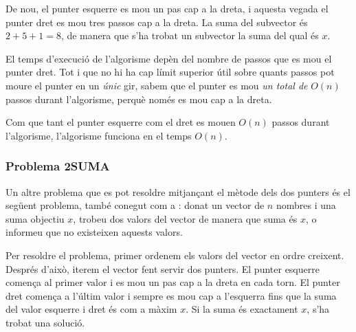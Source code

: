 De nou, el punter esquerre es mou un pas cap a la dreta, i aquesta
vegada el punter dret es mou tres passos cap a la dreta. La suma del
subvector és $2+5+1=8$, de manera que s'ha trobat un subvector la suma
del qual és $x$.


\begin{center}
\end{center}


El temps d'execució de l'algorisme depèn del nombre de passos que es
mou el punter dret. Tot i que no hi ha cap límit superior útil sobre
quants passos pot moure el punter en un \emph{únic} gir, sabem que el
punter es mou \emph{un total de} $O(n)$ passos durant l'algorisme, perquè
només es mou cap a la dreta.

Com que tant el punter esquerre com el dret es mouen $O(n)$ passos durant
l'algorisme, l'algorisme funciona en el temps $O(n)$.

\subsubsection{Problema 2SUMA}


Un altre problema que es pot resoldre mitjançant el mètode dels dos
punters és el següent problema, també conegut com a :
donat un vector de $n$ nombres i una suma objectiu $x$,
trobeu dos valors del vector de manera que suma és $x$, o informeu que
no existeixen aquests valors.

Per resoldre el problema, primer ordenem els valors del vector en
ordre creixent. Després d'això, iterem el vector fent servir dos
punters. El punter esquerre comença al primer valor i es mou un pas
cap a la dreta en cada torn. El punter dret comença a l'últim valor i
sempre es mou cap a l'esquerra fins que la suma del valor esquerre i
dret és com a màxim $x$. Si la suma és exactament $x$, s'ha trobat una
solució.

